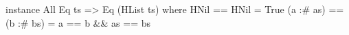 \begin{code}
instance All Eq ts => Eq (HList ts) where
  HNil      == HNil      = True
  (a :# as) == (b :# bs) = a == b && as == bs
\end{code}
